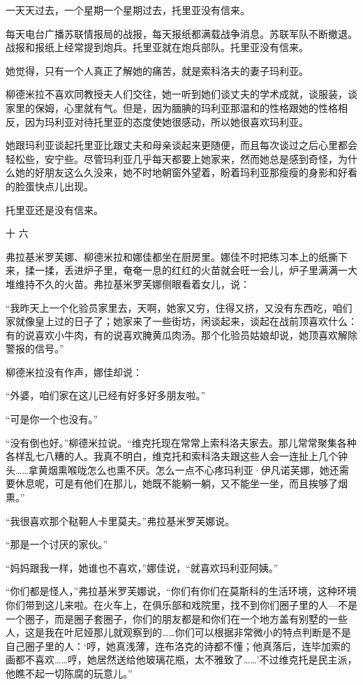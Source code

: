 一天天过去，一个星期一个星期过去，托里亚没有信来。

每天电台广播苏联情报局的战报，每天报纸都满载战争消息。苏联军队不断撤退。战报和报纸上经常提到炮兵。托里亚就在炮兵部队。托里亚没有信来。

她觉得，只有一个人真正了解她的痛苦，就是索科洛夫的妻子玛利亚。

柳德米拉不喜欢同教授夫人们交往，她一听到她们谈丈夫的学术成就，谈服装，谈家里的保姆，心里就有气。但是，因为腼腆的玛利亚那温和的性格跟她的性格相反，因为玛利亚对待托里亚的态度使她很感动，所以她很喜欢玛利亚。

她跟玛利亚谈起托里亚比跟丈夫和母亲谈起来更随便，而且每次谈过之后心里都会轻松些，安宁些。尽管玛利亚几乎每天都要上她家来，然而她总是感到奇怪，为什么她的好朋友这么久没来，她不时地朝窗外望着，盼着玛利亚那瘦瘦的身影和好看的脸蛋快点儿出现。

托里亚还是没有信来。

十 六

弗拉基米罗芙娜、柳德米拉和娜佳都坐在厨房里。娜佳不时把练习本上的纸撕下来，揉一揉，丢进炉子里，奄奄一息的红红的火苗就会旺一会儿，炉子里满满一大堆维持不久的火苗。弗拉基米罗芙娜侧眼看着女儿，说：

“我昨天上一个化验员家里去，天啊，她家又穷，住得又挤，又没有东西吃，咱们家就像皇上过的日子了；她家来了一些街坊，闲谈起来，谈起在战前顶喜欢什么：有的说喜欢小牛肉，有的说喜欢腌黄瓜肉汤。那个化验员姑娘却说，她顶喜欢解除警报的信号。”

柳德米拉没有作声，娜佳却说：

“外婆，咱们家在这儿已经有好多好多朋友啦。”

“可是你一个也没有。”

“没有倒也好。”柳德米拉说。“维克托现在常常上索科洛夫家去。那儿常常聚集各种各样乱七八糟的人。我真不明白，维克托和索科洛夫跟这些人会一连扯上几个钟头……拿黄烟熏喉咙怎么也熏不厌。怎么一点不心疼玛利亚·伊凡诺芙娜，她还需要休息呢，可是有他们在那儿，她既不能躺一躺，又不能坐一坐，而且挨够了烟熏。”

“我很喜欢那个鞑靼人卡里莫夫。”弗拉基米罗芙娜说。

“那是一个讨厌的家伙。”

“妈妈跟我一样，她谁也不喜欢，”娜佳说，“就喜欢玛利亚阿姨。”

“你们都是怪人，”弗拉基米罗芙娜说，“你们有你们在莫斯科的生活环境，这种环境你们带到这儿来啦。在火车上，在俱乐部和戏院里，找不到你们圈子里的人—不是一个圈子，而是圈子套圈子，你们的朋友都是和你们在一个地方盖有别墅的一些人，这是我在叶尼娅那儿就观察到的……你们可以根据非常微小的特点判断是不是自己圈子里的人：‘哼，她真浅薄，连布洛克的诗都不懂；他真落后，连毕加索的画都不喜欢……哼，她居然送给他玻璃花瓶，太不雅致了……’不过维克托是民主派，他瞧不起一切陈腐的玩意儿。”


